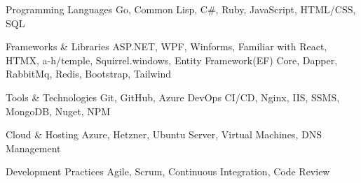
\begin{cvskills}

  \cvskill
    {Programming Languages} %
    {Go, Common Lisp, C\#, Ruby, JavaScript, HTML/CSS, SQL} %

  \cvskill
    {Frameworks \& Libraries} %
    {ASP.NET, WPF, Winforms, Familiar with React, HTMX, a-h/temple, Squirrel.windows, Entity Framework(EF) Core, Dapper, RabbitMq, Redis, Bootstrap, Tailwind} %

  \cvskill
    {Tools \& Technologies} %
    {Git, GitHub, Azure DevOps CI/CD, Nginx, IIS, SSMS, MongoDB, Nuget, NPM} %

  \cvskill
    {Cloud \& Hosting} %
    {Azure, Hetzner, Ubuntu Server, Virtual Machines, DNS Management} %

  \cvskill
    {Development Practices} %
    {Agile, Scrum, Continuous Integration, Code Review} %

\end{cvskills}